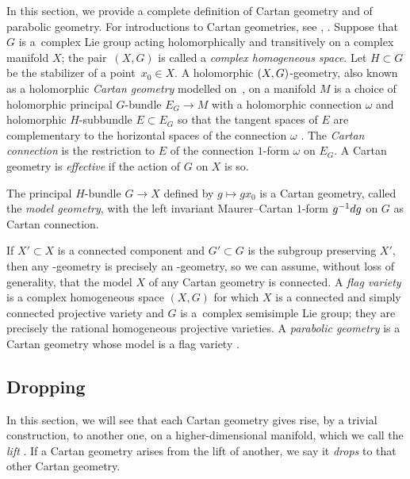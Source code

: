\documentclass[11pt]{article}
\numberwithin{equation}{section}
\numberwithin{equation}{section}
\begin{document}
In this section, we provide a complete definition of Cartan geometry and of parabolic geometry.
For introductions to Cartan geometries, see \cite[Chapter~1]{Cap/Slovak:2009}, \cite{mckay2023introduction,Sharpe:2002}.
Suppose that $G$ is a~complex Lie group acting holomorphically and transitively on a complex manifold $X$;
the pair~$(X, G)$ is called a \emph{complex homogeneous space}.
Let $H \subset G$ be the stabilizer of a point~$x_0 \in X$.
A holomorphic $\left(X, G\right)$-geometry, also known as a holomorphic \emph{Cartan geometry} modelled on~, on a manifold $M$ is a
choice of holomorphic principal $G$-bundle $E_G \to M$ with a holomorphic connection
$\omega$ and holomorphic $H$-subbundle $E \subset E_G$ so that the tangent spaces of $E$ are complementary to the horizontal
spaces of the connection $\omega$ \cite{Sharpe:2002}.
The \emph{Cartan connection} is the restriction to $E$ of the connection $1$-form $\omega$ on $E_G$.
A Cartan geometry is \emph{effective} if the action of $G$ on $X$ is so.

The principal $H$-bundle $G \to X$ defined by $g \longmapsto gx_0$ is a Cartan geometry, called the \emph{model
geometry}, with the left invariant Maurer--Cartan $1$-form $g^{-1} {\rm d}g$ on $G$ as Cartan connection.

If $X' \subset X$ is a connected component and $G' \subset G$ is the subgroup preserving $X'$, then any -geometry
is precisely an -geometry, so we can assume, without loss of generality, that the model $X$ of any Cartan geometry is connected.
A \emph{flag variety} is a complex homogeneous space $(X, G)$ for which $X$ is a connected and simply connected projective variety
and $G$ is a~complex semisimple Lie group; they are precisely the rational homogeneous projective varieties.
A \emph{parabolic geometry} is a Cartan geometry whose model is a flag variety \cite{Cap/Slovak:2009}.

\subsection{Dropping}
In this section, we will see that each Cartan geometry gives rise, by a trivial construction, to another one, on a higher-dimensional manifold, which we call the \emph{lift} \cite[Section 9]{mckay2023introduction}.
If a Cartan geometry arises from the lift of another, we say it \emph{drops} to that other Cartan geometry.
\end{document}
